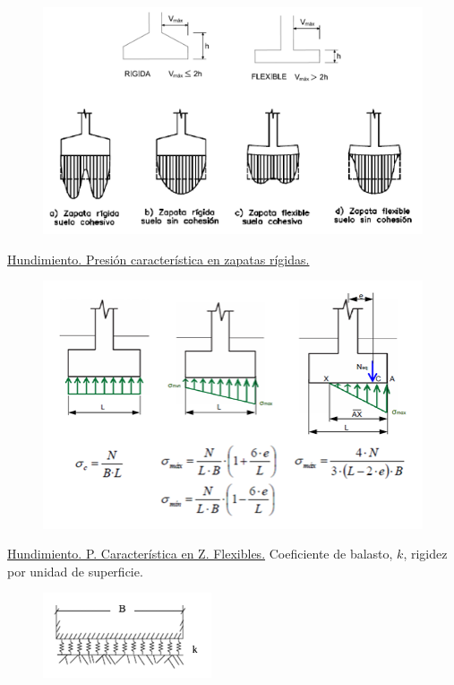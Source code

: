 \begin{figure}[H]
    \centering
    \includegraphics[width=1\linewidth]{Imagenes/Zapatas rigidas y flexibles.png}
\end{figure}

\noindent \underline{Hundimiento. Presión característica en zapatas rígidas.}

\begin{figure}[H]
    \centering
    \includegraphics[width=1\linewidth]{Imagenes/Presion caracteristica en zapatas rigidas.png}
\end{figure}

\noindent \underline{Hundimiento. P. Característica en Z. Flexibles.}
Coeficiente de balasto, $k$, rigidez por unidad de superficie.

\begin{figure}[H]
    \centering
    \includegraphics[width = 0.75 \linewidth]{Imagenes/Coeficiente de balasto.png}
\end{figure}

